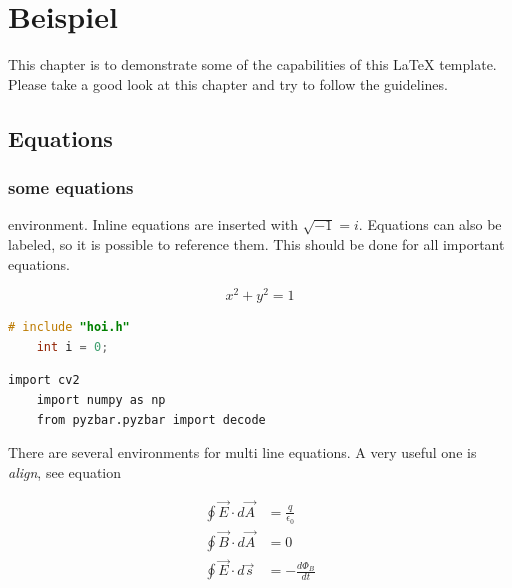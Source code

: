 
\chapter{Beispiel}

This chapter is to demonstrate some of the capabilities of this \LaTeX{} template.
Please take a good look at this chapter and try to follow the guidelines.

\section{Equations}
\subsection{some equations}
%
environment. Inline equations are inserted with $\sqrt{-1} = i $. Equations can
also be labeled, so it is possible to reference them. This should be done for
all important equations.

\begin{equation}
    x^2 + y^2 = 1
    \label{equ:bsp_chapter:example_equation}
\end{equation}

\begin{lstlisting}[language=C,label=bsp,caption=bsp]
	# include "hoi.h"
	int i = 0;
\end{lstlisting}

\begin{lstlisting}[label=bsp,caption=bsp]
	import cv2
	import numpy as np
	from pyzbar.pyzbar import decode
\end{lstlisting}

%

There are several environments for multi line equations. A very useful one
is \emph{align}, see equation %

\begin{align}
    \oint \vec{E} \cdot d \vec{A} & = \frac{q}{\epsilon_0}  \\
    \oint \vec{B} \cdot d \vec{A} & = 0                     \\
    \oint \vec{E} \cdot d \vec{s} & = - \frac{d \Phi_B}{dt}
    \label{equ:bsp_chapter:example_align}
\end{align}

